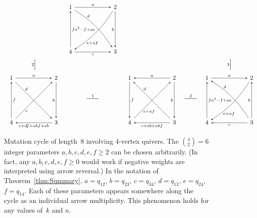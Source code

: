 \documentclass[11pt, letterpaper]{amsart}
\theoremstyle{definition}
\numberwithin{equation}{section}
\newcommand{\mutation}[1]{\stackrel{#1}{\rule[.5ex]{2em}{0.5pt}}}
\newcommand{\vmutation}[1]{  {\scriptstyle #1}{\Bigl|\Bigr.}  }
\begin{document}
\begin{figure}[ht]
\begin{equation*}
\begin{array}{ccccccc}
&  \begin{tikzcd}[arrows={-stealth}, sep=6em]
  1     \arrow[dr, "d", bend left=12, near start, outer sep=-.8]  \arrow[d, "fa^2-f+ae", stealth-]   
  &2  \arrow[d, swap, "b"] \arrow[l, "a", swap, stealth-]
  \\
   4   \arrow[ur, "e+af", bend right=12, swap, near start, outer sep=-1.8, stealth-]
   &3  \arrow[l, "c", stealth-] 
\end{tikzcd}
 & \\
\\[-8pt]
\vmutation{2}   & & & & \vmutation{3} \\[-6pt]
\\
\begin{tikzcd}[arrows={-stealth}, sep=6em]
  1  \arrow[r,  "a"]
  & 2  \arrow[d, swap, "b"]
  \\
   4 \arrow[ur, "e", swap, near start, outer sep=-1] \arrow[u, swap, "f", -stealth] \arrow[r, "c+df+abf+eb", swap, stealth-]  
   & 3  \arrow[ul, "d", near end, swap, outer sep=-1, stealth-]
\end{tikzcd}
& \mutation 1
& \begin{tikzcd}[arrows={-stealth}, sep=6em]
  1     \arrow[dr, "d", near start, outer sep=-.8, stealth-]  \arrow[d,  "f"]   
  &2  \arrow[d, swap, "b"] \arrow[l, "a", swap ]
  \\
   4   \arrow[ur, "e+af", swap, near start, outer sep=-1.8]
   &3  \arrow[l, "c+eb+abf"] 
\end{tikzcd}
& \mutation 2 
&  \begin{tikzcd}[arrows={-stealth}, sep=6em]
  1     \arrow[dr, "d", near start, outer sep=-.8, bend left=12, stealth-]  \arrow[d, "fa^2-f+ae", stealth-]   
  &2  \arrow[d, swap, "b", stealth-] \arrow[l, "a", swap, stealth-]
  \\
   4   \arrow[ur, "e+af", swap, bend right=12, near start, outer sep=-1.8, stealth-]
   &3  \arrow[l, "c"] 
\end{tikzcd}
\end{array}
\hspace{-17pt} 
\end{equation*}
\caption{Mutation cycle of length~8 involving 4-vertex quivers.  
The $\binom{4}{2}=6$ integer parameters $a,b,c,d,e,f \geq 2$ can be chosen arbitrarily. 
(In fact, any $a,b,c,d,e,f\ge0$ would work if negative weights are interpreted using arrow reversal.) 
In the notation of Theorem~\ref{thm:Summary}, $a=q_{12}$, $b=q_{23}$, $c=q_{34}$, $d=q_{13}$, $e=q_{24}$, $f=q_{14}$. 
Each of these parameters appears somewhere along the cycle as an individual arrow multiplicity.
This phenomenon holds for any values of~$k$ and $n$. 
}
\label{fig:generic-8-cycle}
\vspace{-.2in}
\end{figure}
\end{document}
